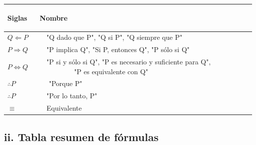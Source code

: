 \begin{spacing}{1}
\begin{center}
\begin{tabular}{ |p{2.5cm}|p{9.5cm}|}
\hline 
\rowcolor{orange!50}
\begin{center}\textbf{Siglas} \end{center} & \begin{center} \textbf{Nombre} \end{center} \\ \hline 

$ Q \Leftarrow P $　&　"Q dado que P", "Q si P", "Q siempre que P" \\ \hline

$ P \Rightarrow Q $　&　"P implica Q", "Si P, entonces Q", "P sólo si Q" \\ \hline

$ P \Leftrightarrow Q $　&　"P si y sólo si Q", "P es necesario y suficiente para Q", 
　　　　　"P es equivalente con Q"\\ \hline

$ \therefore P　$ &　 "Porque P" \\ \hline

$ \therefore  P $　&　"Por lo tanto, P" \\ \hline

$\equiv$ &　Equivalente \\ \hline

\end{tabular}
\end{center}
\end{spacing}
\newpage

\begin{center}
\section*{ii. Tabla resumen de fórmulas}
\end{center}

